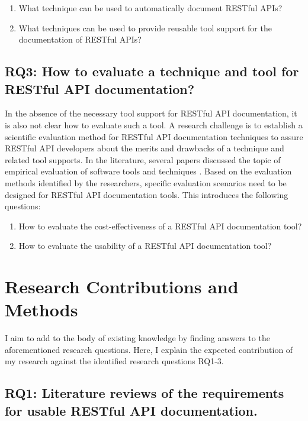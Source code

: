 \documentclass[11pt,oneside]{book}
\begin{document}
\begin{enumerate}
  \item What technique can be used to automatically document RESTful APIs?
  \item What techniques can be used to provide reusable tool support for the documentation of RESTful APIs?
\end{enumerate}

\section{RQ3: How to evaluate a technique and tool for RESTful API documentation?}

In the absence of the necessary tool support for RESTful API documentation, it is also not clear how to evaluate such a tool. A research challenge is to establish a scientific evaluation method for RESTful API documentation techniques to assure RESTful API developers about the merits and drawbacks of a technique and related tool supports. In the literature, several papers discussed the topic of empirical evaluation of software tools and techniques \cite{runeson2009guidelines,sjoberg2002conducting,lethbridge2005studying,kitchenham2008evaluating,easterbrook2008selecting}. Based on the evaluation methods identified by the researchers, specific evaluation scenarios need to be designed for RESTful API documentation tools. This introduces the following questions:

\begin{enumerate}
\item How to evaluate the cost-effectiveness of a RESTful API documentation tool?
\item How to evaluate the usability of a RESTful API documentation tool?
\end{enumerate}


\chapter{Research Contributions and Methods}

I aim to add to the body of existing knowledge by finding answers to the aforementioned research questions. Here, I explain the expected contribution of my research against the identified research questions RQ1-3.

\section{RQ1: Literature reviews of the requirements for usable RESTful API documentation.}
\end{document}
